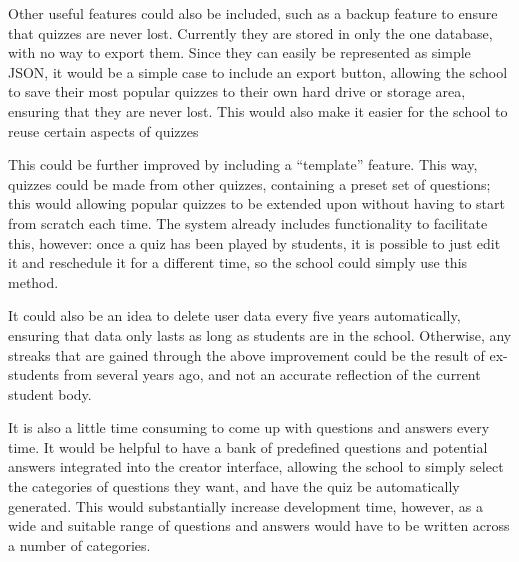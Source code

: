 Other useful features could also be included, such as a backup feature to ensure that quizzes are never lost. Currently they are stored in only the one database, with no way to export them. Since they can easily be represented as simple JSON, it would be a simple case to include an export button, allowing the school to save their most popular quizzes to their own hard drive or storage area, ensuring that they are never lost. This would also make it easier for the school to reuse certain aspects of quizzes

This could be further improved by including a ``template'' feature. This way, quizzes could be made from other quizzes, containing a preset set of questions; this would allowing popular quizzes to be extended upon without having to start from scratch each time. The system already includes functionality to facilitate this, however: once a quiz has been played by students, it is possible to just edit it and reschedule it for a different time, so the school could simply use this method.

It could also be an idea to delete user data every five years automatically, ensuring that data only lasts as long as students are in the school. Otherwise, any streaks that are gained through the above improvement could be the result of ex-students from several years ago, and not an accurate reflection of the current student body.

It is also a little time consuming to come up with questions and answers every time. It would be helpful to have a bank of predefined questions and potential answers integrated into the creator interface, allowing the school to simply select the categories of questions they want, and have the quiz be automatically generated. This would substantially increase development time, however, as a wide and suitable range of questions and answers would have to be written across a number of categories.
